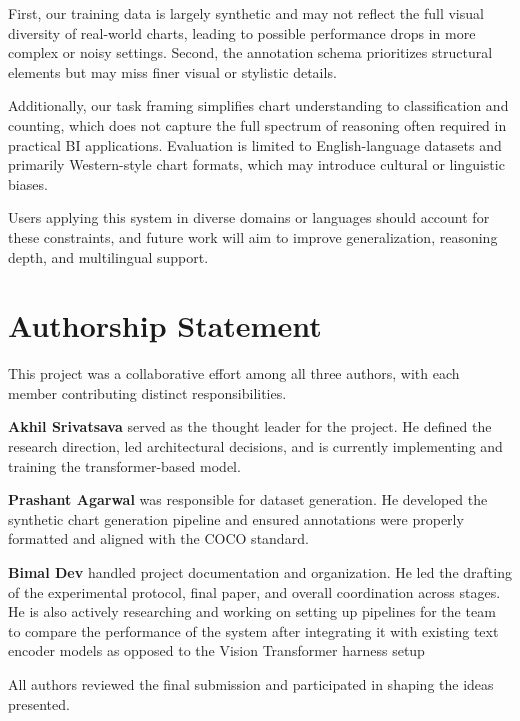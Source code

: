 \documentclass[11pt]{article}
\begin{document}
First, our training data is largely synthetic and may not reflect the full visual diversity of real-world charts, leading to possible performance drops in more complex or noisy settings. Second, the annotation schema prioritizes structural elements but may miss finer visual or stylistic details.

Additionally, our task framing simplifies chart understanding to classification and counting, which does not capture the full spectrum of reasoning often required in practical BI applications. Evaluation is limited to English-language datasets and primarily Western-style chart formats, which may introduce cultural or linguistic biases.

Users applying this system in diverse domains or languages should account for these constraints, and future work will aim to improve generalization, reasoning depth, and multilingual support.


\section*{Authorship Statement}

This project was a collaborative effort among all three authors, with each member contributing distinct responsibilities.

\textbf{Akhil Srivatsava} served as the thought leader for the project. He defined the research direction, led architectural decisions, and is currently implementing and training the transformer-based model.

\textbf{Prashant Agarwal} was responsible for dataset generation. He developed the synthetic chart generation pipeline and ensured annotations were properly formatted and aligned with the COCO standard.

\textbf{Bimal Dev} handled project documentation and organization. He led the drafting of the experimental protocol, final paper, and overall coordination across stages. He is also actively researching and working on setting up pipelines for the team to compare the performance of the system after integrating it with existing text encoder models as opposed to the Vision Transformer harness setup  

All authors reviewed the final submission and participated in shaping the ideas presented.




\appendix
\end{document}
